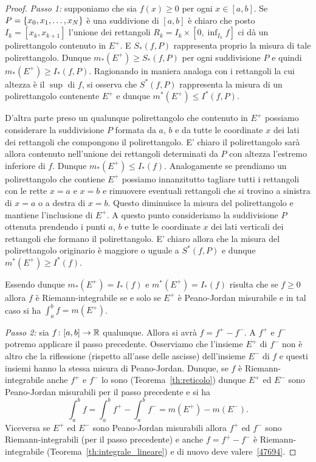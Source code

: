 \begin{proof}
\emph{Passo 1:} supponiamo che sia $f(x)\ge 0$ per ogni $x\in [a,b]$.
Se $P={\left\{ x_0,x_1, \dots, x_N \right\}}$ è una suddivione di $[a,b]$ 
è chiaro che posto $I_k = [x_k,x_{k+1}]$ l'unione dei rettangoli 
$R_k = I_k \times [0,\inf_{I_k} f]$ ci dà
un polirettangolo contenuto in $E^+$.
E $S_*(f,P)$ rappresenta proprio la misura di tale polirettangolo.
Dunque $m_*(E^+)\ge S_*(f,P)$ per ogni suddivisione $P$ 
e quindi $m_*(E^+)\ge I_*(f,P)$.
Ragionando in maniera analoga con i rettangoli la cui altezza 
è il $\sup$ di $f$, si osserva che $S^*(f,P)$ rappresenta 
la misura di un polirettangolo contenente $E^+$ e dunque 
$m^*(E^+)\le I^*(f,P)$.

D'altra parte preso un qualunque polirettangolo che contenuto in $E^+$
possiamo considerare la suddivisione $P$ formata da $a$, $b$ e da tutte le coordinate $x$ 
dei lati dei rettangoli che compongono il polirettangolo. 
E' chiaro il polirettangolo sarà allora contenuto nell'unione
dei rettangoli determinati da $P$ con altezza l'estremo inferiore di $f$.
Dunque $m_*(E^+)\le I_*(f)$.
Analogamente se prendiamo un polirettangolo che contiene $E^+$ possiamo 
innanzitutto tagliare tutti i rettangoli con le rette $x=a$ e $x=b$
e rimuovere eventuali rettangoli che si trovino a sinistra di $x=a$ 
o a destra di $x=b$. 
Questo diminuisce la misura del polirettangolo e mantiene l'inclusione di $E^+$.
A questo punto consideriamo la suddivisione $P$ ottenuta prendendo i punti 
$a$, $b$ e tutte le coordinate $x$ dei lati verticali dei rettangoli che formano 
il polirettangolo.
E' chiaro allora che la misura del polirettangolo originario è maggiore o uguale 
a $S^*(f,P)$ e dunque $m^*(E^+)\ge I^*(f)$.

Essendo dunque $m_*(E^+)=I_*(f)$ e $m^*(E^+)=I_*(f)$ risulta 
che se $f\ge0$ allora $f$ è Riemann-integrabile se e solo se $E^+$ è Peano-Jordan 
misurabile e in tal caso si ha $\int_a^b f = m(E^+)$.

\emph{Passo 2:} sia $f\colon[a,b]\to \mathbb R$ qualunque.
Allora si avrà $f = f^+ - f^-$. 
A $f^+$ e $f^-$ potremo applicare il passo precedente.
Osserviamo che l'insieme $E^+$ di $f^-$ non è altro che la riflessione 
(rispetto all'asse delle ascisse) dell'insieme $E^-$ di $f$
e questi insiemi hanno la stessa misura di Peano-Jordan.
Dunque, se $f$ è Riemann-integrabile anche $f^+$ e $f^-$ 
lo sono (Teorema~\ref{th:reticolo}) 
dunque $E^+$ ed $E^-$ sono Peano-Jordan misurabili per il passo precedente
e si ha 
\begin{equation}
  \label{47694}
\int_a^b f = \int_a^b f^+ - \int_a^b f^- = m(E^+) - m(E^-).  
\end{equation}
Viceversa se $E^+$ ed $E^-$ sono Peano-Jordan misurabili 
allora $f^+$ ed $f^-$ sono Riemann-integrabili (per il passo precedente)
e anche $f=f^+-f^-$ è Riemann-integrabile (Teorema~\ref{th:integrale_lineare})
e di nuovo deve valere~\eqref{47694}.
\end{proof}


